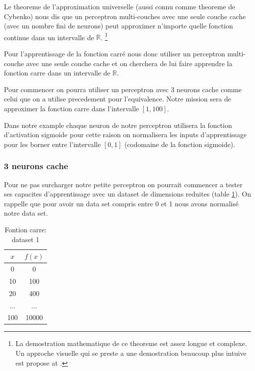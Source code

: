 \documentclass[twoside,openright,a4paper,11pt,french]{article}
\begin{document}
Le theoreme de l'approximation universelle (aussi connu comme theoreme de Cybenko) 
nous dis que un perceptron multi-couches avec une seule couche cache (avec un nombre
fini de neurons) peut approximer n'importe quelle fonction continue dans un 
intervalle de $\mathbb{R}$.
\footnote{
La demostration mathematique de ce theoreme est assez longue et complexe. Un approche visuelle
qui se preste a une demostration beaucoup plus intuive est propose at \cite{visuniprof}.
}
\cite{cybthm}

Pour l'apprentissage de la fonction carré nous donc utiliser un perceptron
multi-couche avec une seule couche cache et on cherchera de lui faire apprendre
la fonction carre dans un intervalle de $\mathbb{R}$.

Pour commencer on pourra utiliser un perceptron avec 3 neurons cache comme
celui que on a utilise precedement pour l'equivalence. Notre mission sera de
approximer la fonction carre dans l'intervalle $[1,100]$.

Dans notre example chaque neuron de notre perceptron utilisera la fonction
d'activation sigmoide pour cette raison on normalisera les inputs
d'apprentissage pour les borner entre l'intervalle $[0,1]$ (codomaine de la
fonction sigmoide).

\subsubsection{3 neurons cache}

Pour ne pas surcharger notre petite perceptron on pourrait commencer a tester
ses capacites d'apprentissage avec un dataset de dimensions reduites (table
\ref{tab:fqt1}). On rappelle que pour avoir un data set compris entre 0 et 1
nous avons normalisé notre data set.

\begin{table}[h]
  \centering
  \begin{tabular}{| c | c |}
    \hline
    \textbf{$x$} & \textbf{$f(x)$}\\
    \hline
    0 & 0 \\
    \hline
    10 & 100 \\
    \hline
    20 & 400 \\
    \hline
    ... & ... \\
    \hline
    100 & 10000 \\
    \hline
  \end{tabular}
  \caption{Fontion carre: dataset 1}
  \label{tab:fqt1}
\end{table}
\end{document}
